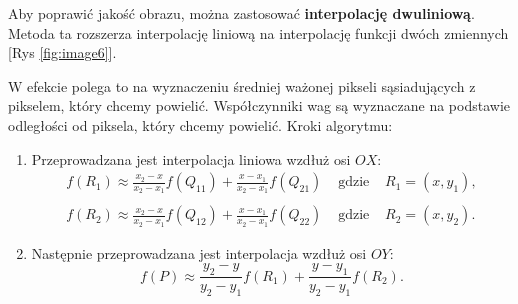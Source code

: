 Aby poprawić jakość obrazu, można zastosować \textbf{interpolację dwuliniową}. Metoda ta rozszerza interpolację liniową na interpolację funkcji dwóch zmiennych [Rys \ref{fig:image6}]. 



W efekcie polega to na wyznaczeniu średniej ważonej pikseli sąsiadujących z pikselem, który chcemy powielić. Współczynniki wag są wyznaczane na podstawie odległości od piksela, który chcemy powielić.
Kroki algorytmu:
\begin{enumerate}
    \item Przeprowadzana jest interpolacja liniowa wzdłuż osi $O X$:
    \begin{equation}
    \begin{array}{llll}
    f\left(R_1\right) \approx \frac{x_2-x}{x_2-x_1} f\left(Q_{11}\right)+\frac{x-x_1}{x_2-x_1} f\left(Q_{21}\right) & \text { gdzie } & R_1=\left(x, y_1\right), \\ \\
    f\left(R_2\right) \approx \frac{x_2-x}{x_2-x_1} f\left(Q_{12}\right)+\frac{x-x_1}{x_2-x_1} f\left(Q_{22}\right) & \text { gdzie } & R_2=\left(x, y_2\right) .
    \end{array}
    \end{equation}
    \item Następnie przeprowadzana jest interpolacja wzdłuż osi $O Y$:
    \begin{equation}
    f(P) \approx \frac{y_2-y}{y_2-y_1} f\left(R_1\right)+\frac{y-y_1}{y_2-y_1} f\left(R_2\right) .
    \label{eq:interpolation2}
    \end{equation}
\end{enumerate}


